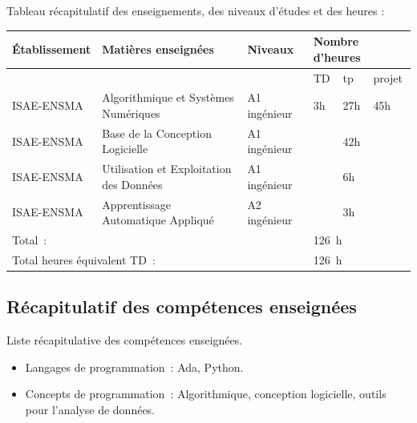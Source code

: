 \documentclass[11pt,a4paper,oneside]{article}
\begin{document}
Tableau récapitulatif des enseignements, des niveaux d'études et des heures :
\begin{center}
	\begin{tabular}{|l|l|l|l|l|l|}
		\hline
		Établissement                                      & Matières enseignées                     & Niveaux      & \multicolumn{3}{l|}{Nombre d'heures}                \\
		\hline
		                                                   &                                         &              & TD                                   & tp  & projet \\
		\hline
		ISAE-ENSMA                                         & Algorithmique et Systèmes Numériques    & A1 ingénieur & 3h                                   & 27h & 45h    \\
		\hline
		ISAE-ENSMA                                         & Base de la Conception Logicielle        & A1 ingénieur &                                      & 42h &        \\
		\hline
		ISAE-ENSMA                                         & Utilisation et Exploitation des Données & A1 ingénieur &                                      & 6h  &        \\
		\hline
		ISAE-ENSMA                                         & Apprentissage Automatique Appliqué      & A2 ingénieur &                                      & 3h  &        \\
		\hline
		\multicolumn{3}{|l|}{Total~:}                      & \multicolumn{3}{l|}{126~h}                                                                                   \\
		\hline
		\multicolumn{3}{|l|}{Total heures équivalent TD~:} & \multicolumn{3}{l|}{126~h}                                                                                   \\
		\hline
	\end{tabular}
\end{center}

\subsection{Récapitulatif des compétences enseignées}

Liste récapitulative des compétences enseignées.
\begin{itemize}
	\item Langages de programmation~: Ada, Python.
	\item Concepts de programmation~: Algorithmique, conception logicielle, outils pour l'analyse de données.
\end{itemize}
\end{document}
